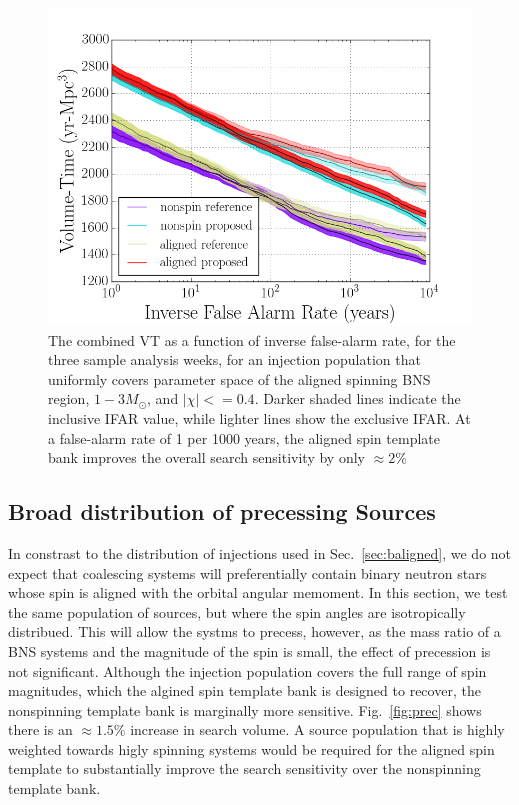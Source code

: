 \begin{figure}
\centering
\includegraphics[width=1.0\textwidth]{papers/bns_o1_dev/figures/aligned_combined.png}
\caption{\label{fig:aligned} 
The combined VT as a function of inverse false-alarm rate, for the
three sample analysis weeks, for an injection population that uniformly covers parameter space of the aligned spinning BNS region, $1- 3M_\odot$, and $|\chi| <= 0.4$. Darker shaded lines indicate the inclusive IFAR value, while lighter lines show the exclusive IFAR. At a false-alarm rate of 1 per 1000 years, the aligned spin template bank improves the overall search sensitivity by only $\approx 2\%$
}
\end{figure}

\subsection{Broad distribution of precessing Sources}

In constrast to the distribution of injections used in Sec.~\ref{sec:baligned}, we do not expect that coalescing systems will preferentially contain binary neutron stars whose spin is aligned with the orbital angular memoment. In this section, we test the same population of sources, but where the spin angles are isotropically distribued. This will allow the systms to precess, however, as the mass ratio of a BNS systems and the magnitude of the spin is small, the effect of precession is not significant. Although the injection population covers the full range of spin magnitudes, which the algined spin template bank is designed to recover, the nonspinning template bank is marginally more sensitive. Fig.~\ref{fig:prec} shows there is an $\approx 1.5\%$ increase in search volume. A source population that is highly weighted towards higly spinning systems would be required for the aligned spin template to substantially improve the search sensitivity over the nonspinning template bank. 

